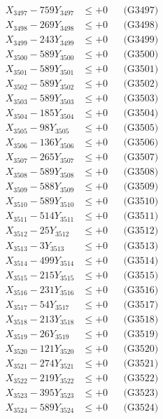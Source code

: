 \documentclass[a4paper,10pt]{article}
\begin{document}
{\begin{align}
X_{3497} - 759Y_{3497} &\leq +0 && \text{(G3497)} \\
X_{3498} - 269Y_{3498} &\leq +0 && \text{(G3498)} \\
X_{3499} - 243Y_{3499} &\leq +0 && \text{(G3499)} \\
X_{3500} - 589Y_{3500} &\leq +0 && \text{(G3500)} \\
\allowbreak
X_{3501} - 589Y_{3501} &\leq +0 && \text{(G3501)} \\
X_{3502} - 589Y_{3502} &\leq +0 && \text{(G3502)} \\
X_{3503} - 589Y_{3503} &\leq +0 && \text{(G3503)} \\
X_{3504} - 185Y_{3504} &\leq +0 && \text{(G3504)} \\
X_{3505} - 98Y_{3505} &\leq +0 && \text{(G3505)} \\
X_{3506} - 136Y_{3506} &\leq +0 && \text{(G3506)} \\
X_{3507} - 265Y_{3507} &\leq +0 && \text{(G3507)} \\
X_{3508} - 589Y_{3508} &\leq +0 && \text{(G3508)} \\
X_{3509} - 588Y_{3509} &\leq +0 && \text{(G3509)} \\
X_{3510} - 589Y_{3510} &\leq +0 && \text{(G3510)} \\
\allowbreak
X_{3511} - 514Y_{3511} &\leq +0 && \text{(G3511)} \\
X_{3512} - 25Y_{3512} &\leq +0 && \text{(G3512)} \\
X_{3513} - 3Y_{3513} &\leq +0 && \text{(G3513)} \\
X_{3514} - 499Y_{3514} &\leq +0 && \text{(G3514)} \\
X_{3515} - 215Y_{3515} &\leq +0 && \text{(G3515)} \\
X_{3516} - 231Y_{3516} &\leq +0 && \text{(G3516)} \\
X_{3517} - 54Y_{3517} &\leq +0 && \text{(G3517)} \\
X_{3518} - 213Y_{3518} &\leq +0 && \text{(G3518)} \\
X_{3519} - 26Y_{3519} &\leq +0 && \text{(G3519)} \\
X_{3520} - 121Y_{3520} &\leq +0 && \text{(G3520)} \\
\allowbreak
X_{3521} - 274Y_{3521} &\leq +0 && \text{(G3521)} \\
X_{3522} - 219Y_{3522} &\leq +0 && \text{(G3522)} \\
X_{3523} - 395Y_{3523} &\leq +0 && \text{(G3523)} \\
X_{3524} - 589Y_{3524} &\leq +0 && \text{(G3524)} \\

\end{align}}
\end{document}

